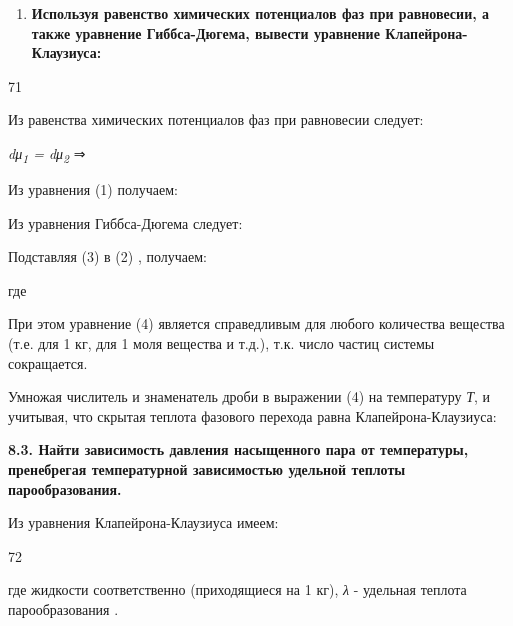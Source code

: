 \begin{enumerate}
\def\labelenumi{\arabic{enumi}.}
\setcounter{enumi}{1}
\item
  \textbf{Используя равенство химических потенциалов фаз при равновесии,
  а также уравнение Гиббса-Дюгема, вывести уравнение
  Клапейрона-Клаузиуса:} %
\end{enumerate}

71

\solving{}

Из равенства химических потенциалов фаз при равновесии следует:

\emph{dμ\textsubscript{1} = dμ\textsubscript{2}} ⇒

Из уравнения (1) получаем:


Из уравнения Гиббса-Дюгема следует:


Подставляя (3) в (2) , получаем:


где %


При этом уравнение (4) является справедливым для любого количества
вещества (т.е. для 1 кг, для 1 моля вещества и т.д.), т.к. число частиц
системы сокращается.

Умножая числитель и знаменатель дроби в выражении (4) на температуру
\emph{Т}, и учитывая, что скрытая теплота фазового перехода равна
Клапейрона-Клаузиуса:


\textbf{8.3. Найти зависимость давления насыщенного пара от температуры,
пренебрегая температурной зависимостью удельной теплоты
парообразования.}

\solving{}

Из уравнения Клапейрона-Клаузиуса имеем:


72

где %
жидкости соответственно (приходящиеся на 1 кг), \emph{λ} - удельная
теплота парообразования .

